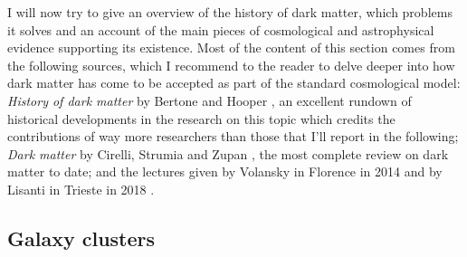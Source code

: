 I will now try to give an overview of the history of dark matter, which problems it solves and an account of the main pieces of cosmological and astrophysical evidence supporting its existence. Most of the content of this section comes from the following sources, which I recommend to the reader to delve deeper into how dark matter has come to be accepted as part of the standard cosmological model: \emph{History of dark matter} by Bertone and Hooper \cite{Bertone_2018}, an excellent rundown of historical developments in the research on this topic which credits the contributions of way more researchers than those that I'll report in the following; \emph{Dark matter} by Cirelli, Strumia and Zupan \cite{Cirelli_2024}, the most complete review on dark matter to date; and the lectures given by Volansky in Florence in 2014 \cite{Volansky_2014} and by Lisanti in Trieste in 2018 \cite{Lisanti_2018}.

\subsection{Galaxy clusters}


